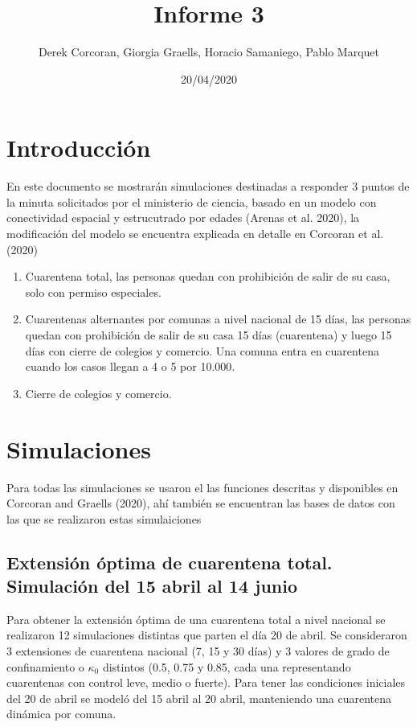 \documentclass[]{article}
\title{Informe 3}
\author{Derek Corcoran, Giorgia Graells, Horacio Samaniego, Pablo Marquet}
\date{20/04/2020}
\begin{document}
\maketitle

\hypertarget{introducciuxf3n}{%
\section{Introducción}\label{introducciuxf3n}}

En este documento se mostrarán simulaciones destinadas a responder 3 puntos de la minuta solicitados por el ministerio de ciencia, basado en un modelo con conectividad espacial y estrucutrado por edades (Arenas et al. 2020), la modificación del modelo se encuentra explicada en detalle en Corcoran et al. (2020)

\begin{enumerate}
\def\labelenumi{\arabic{enumi}.}
\item
  Cuarentena total, las personas quedan con prohibición de salir de su casa, solo con permiso especiales.
\item
  Cuarentenas alternantes por comunas a nivel nacional de 15 días, las personas quedan con prohibición de salir de su casa 15 días (cuarentena) y luego 15 días con cierre de colegios y comercio. Una comuna entra en cuarentena cuando los casos llegan a 4 o 5 por 10.000.
\item
  Cierre de colegios y comercio.
\end{enumerate}

\hypertarget{simulaciones}{%
\section{Simulaciones}\label{simulaciones}}

Para todas las simulaciones se usaron el las funciones descritas y disponibles en Corcoran and Graells (2020), ahí también se encuentran las bases de datos con las que se realizaron estas simulaiciones

\hypertarget{extensiuxf3n-uxf3ptima-de-cuarentena-total.-simulaciuxf3n-del-15-abril-al-14-junio}{%
\subsection{Extensión óptima de cuarentena total. Simulación del 15 abril al 14 junio}\label{extensiuxf3n-uxf3ptima-de-cuarentena-total.-simulaciuxf3n-del-15-abril-al-14-junio}}

Para obtener la extensión óptima de una cuarentena total a nivel nacional se realizaron 12 simulaciones distintas que parten el día 20 de abril. Se consideraron 3 extensiones de cuarentena nacional (7, 15 y 30 días) y 3 valores de grado de confinamiento o \(\kappa_0\) distintos (0.5, 0.75 y 0.85, cada una representando cuarentenas con control leve, medio o fuerte). Para tener las condiciones iniciales del 20 de abril se modeló del 15 abril al 20 abril, manteniendo una cuarentena dinámica por comuna.
\end{document}

